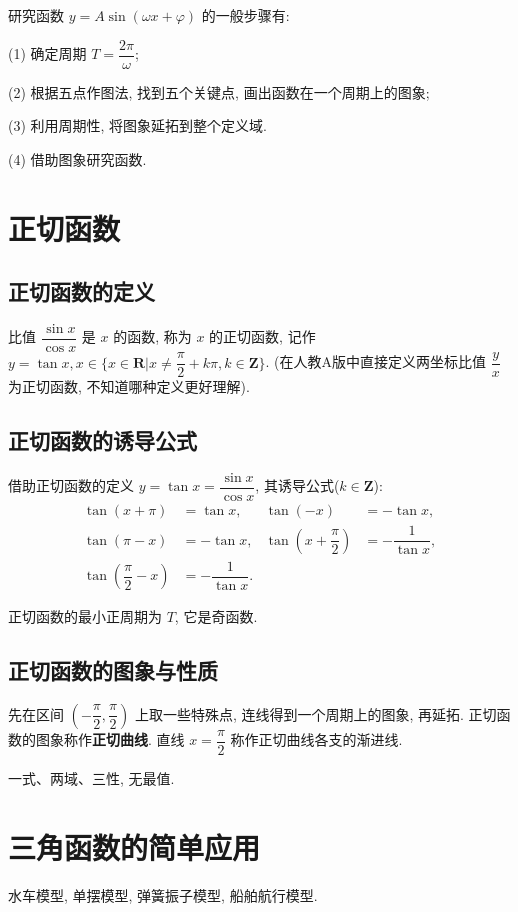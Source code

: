 \documentclass[titlepage]{ctexart}
\begin{document}
研究函数 $y = A\sin(\omega x + \varphi)$ 的一般步骤有:

(1) 确定周期 $T = \dfrac{2\pi}{\omega}$;

(2) 根据五点作图法, 找到五个关键点, 画出函数在一个周期上的图象;

(3) 利用周期性, 将图象延拓到整个定义域.

(4) 借助图象研究函数.

\section{正切函数}

\subsection{正切函数的定义}

比值 $\dfrac{\sin x}{\cos x}$ 是 $x$ 的函数, 称为 $x$ 的正切函数,
记作 $y = \tan x, x\in \{x\in \mathbf{R}|x \neq \dfrac{\pi}{2}+k\pi, k\in \mathbf{Z}\}$.
(在人教A版中直接定义两坐标比值 $\dfrac{y}{x}$ 为正切函数, 不知道哪种定义更好理解).

\subsection{正切函数的诱导公式}

借助正切函数的定义 $y = \tan x = \dfrac{\sin x}{\cos x}$, 其诱导公式($k \in \mathbf{Z}$):
\begin{align*}
    \tan(x + \pi) &= \tan x, & \tan(-x) &= -\tan x, \\
    \tan(\pi - x) &= -\tan x, & \tan(x + \dfrac{\pi}{2}) &= -\dfrac{1}{\tan x}, \\
    \tan(\dfrac{\pi}{2} - x) &= -\dfrac{1}{\tan x}.
\end{align*}

正切函数的最小正周期为 $T$, 它是奇函数.

\subsection{正切函数的图象与性质}

先在区间 $(-\dfrac{\pi}{2}, \dfrac{\pi}{2})$ 上取一些特殊点, 连线得到一个周期上的图象, 再延拓.
正切函数的图象称作\textbf{正切曲线}. 直线 $x = \dfrac{\pi}{2}$ 称作正切曲线各支的渐进线.

一式、两域、三性, 无最值.

\section{三角函数的简单应用}

水车模型, 单摆模型, 弹簧振子模型, 船舶航行模型.
\end{document}
